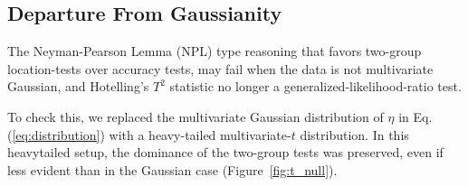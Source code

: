 \documentclass[journal]{IEEEtran}
\begin{document}
%
%
%
%
%


\subsection{Departure From Gaussianity}
The Neyman-Pearson Lemma (NPL) type reasoning that favors two-group location-tests over accuracy tests, may fail when the data is not multivariate Gaussian, and Hotelling's $T^2$ statistic no longer a generalized-likelihood-ratio test. 

To check this, we replaced the multivariate Gaussian distribution of $\eta$ in Eq.(\ref{eq:distribution}) with a heavy-tailed multivariate-$t$ distribution. 
In this heavytailed setup, the dominance of the two-group tests was preserved, even if less evident than in the Gaussian case (Figure~\ref{fig:t_null}).
\end{document}
